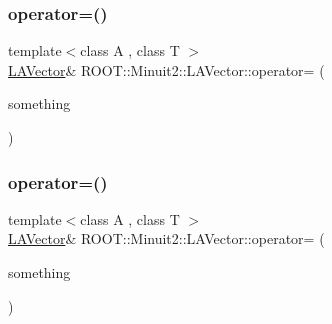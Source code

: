 \mbox{\label{classROOT_1_1Minuit2_1_1LAVector_a968511a119769ea707df72b17fc044c9}} 
\subsubsection{\texorpdfstring{operator=()}{operator=()}\hspace{0.1cm}{\footnotesize\ttfamily [8/21]}}
{\footnotesize\ttfamily template$<$class A , class T $>$ \\
\mbox{\hyperlink{classROOT_1_1Minuit2_1_1LAVector}{L\+A\+Vector}}\& R\+O\+O\+T\+::\+Minuit2\+::\+L\+A\+Vector\+::operator= (\begin{DoxyParamCaption}\item[{const \mbox{\hyperlink{classROOT_1_1Minuit2_1_1ABObj}{A\+B\+Obj}}$<$ \mbox{\hyperlink{classROOT_1_1Minuit2_1_1vec}{vec}}, \mbox{\hyperlink{classROOT_1_1Minuit2_1_1ABObj}{A\+B\+Obj}}$<$ \mbox{\hyperlink{classROOT_1_1Minuit2_1_1vec}{vec}}, A, T $>$, T $>$ \&}]{something }\end{DoxyParamCaption})\hspace{0.3cm}{\ttfamily [inline]}}

\mbox{\label{classROOT_1_1Minuit2_1_1LAVector_a968511a119769ea707df72b17fc044c9}} 
\subsubsection{\texorpdfstring{operator=()}{operator=()}\hspace{0.1cm}{\footnotesize\ttfamily [9/21]}}
{\footnotesize\ttfamily template$<$class A , class T $>$ \\
\mbox{\hyperlink{classROOT_1_1Minuit2_1_1LAVector}{L\+A\+Vector}}\& R\+O\+O\+T\+::\+Minuit2\+::\+L\+A\+Vector\+::operator= (\begin{DoxyParamCaption}\item[{const \mbox{\hyperlink{classROOT_1_1Minuit2_1_1ABObj}{A\+B\+Obj}}$<$ \mbox{\hyperlink{classROOT_1_1Minuit2_1_1vec}{vec}}, \mbox{\hyperlink{classROOT_1_1Minuit2_1_1ABObj}{A\+B\+Obj}}$<$ \mbox{\hyperlink{classROOT_1_1Minuit2_1_1vec}{vec}}, A, T $>$, T $>$ \&}]{something }\end{DoxyParamCaption})\hspace{0.3cm}{\ttfamily [inline]}}

